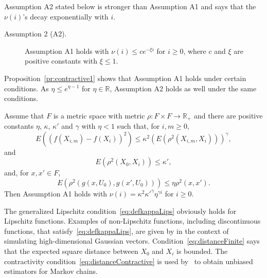 \documentclass[a4paper,11pt]{article}
\begin{document}
Assumption A2 stated below is stronger than Assumption A1 and  says that the \(\nu(i)\)'s decay exponentially with \(i\).
\begin{description}
\item[Assumption 2 (A2).] Assumption A1 holds with \(\nu(i)\le c e^{-\xi i}\) for \(i\geq0\), where  \(c\) and \(\xi\) are positive constants with \(\xi\leq1\).
 \end{description}Proposition~\ref{pr:contractive1} shows that Assumption A1 holds under   certain conditions. As \(\eta\leq e^{\eta-1}\) for \(\eta\in\mathbb{R}\), Assumption A2 holds as well under the same conditions.    
\begin{proposition}
\label{pr:contractive1}Assume that \(F\) is a metric space with metric \(\rho:F\times F\rightarrow\mathbb{R}_{+}\) and there   are positive constants \(\eta\), \(\kappa\), \(\kappa'\) and \(\gamma\) with \(\eta<1\) such that, for \(i,m\geq0\), \begin{equation}\label{eq:defkappaLips}
E((f(X_{i,m})-f(X_{i}))^{2})\leq \kappa^{2}( E(\rho^{2}(X_{i,m},X_{i})))^{\gamma}, \end{equation} 
and \begin{equation}\label{eq:distanceFinite}
E(\rho^{2}(X_{0},X_{i}))\leq\kappa',
\end{equation}and, for \(x,x'\in F\),
\begin{equation}\label{eq:distanceContractive}
E(\rho^{2}( g(x,U_{0}),g(x',U_{0})))\leq\eta \rho^{2}( x,x').
\end{equation} 
Then Assumption A1 holds with \(\nu(i)=\kappa^{2}\kappa'^{\gamma}\eta^{\gamma i}\) for \(i\geq0\).\end{proposition}
The generalized Lipschitz condition~\eqref{eq:defkappaLips} obviously holds for Lipschitz functions. Examples of non-Lipschitz functions, including discontinuous functions, that satisfy~\eqref{eq:defkappaLips}, are given by  \citet{kahaleGaussian2019}  in the context of simulating high-dimensional Gaussian vectors.  Condition~\eqref{eq:distanceFinite} says that the expected square distance between \(X_{0}\) and \(X_{i}\) is bounded. The contractivity  condition~\eqref{eq:distanceContractive} is used by~\citet{glynn2014exact} to obtain unbiased estimators for Markov chains.
\end{document}
